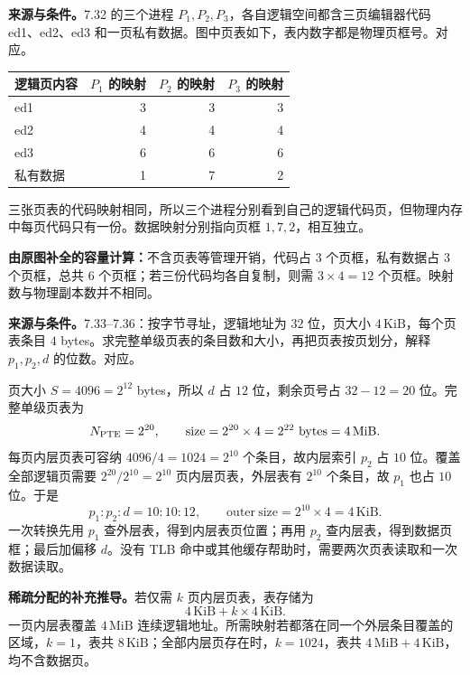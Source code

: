 \nopagebreak[4]
\textbf{来源与条件。}7.32 的三个进程 $P_1,P_2,P_3$，各自逻辑空间都含三页编辑器代码 ed1、ed2、ed3 和一页私有数据。图中页表如下，表内数字都是物理页框号。对应。
\begin{center}
\begin{tabular}{@{}lrrr@{}}
\toprule
逻辑页内容 & $P_1$ 的映射 & $P_2$ 的映射 & $P_3$ 的映射 \\
\midrule
ed1 & 3 & 3 & 3 \\
ed2 & 4 & 4 & 4 \\
ed3 & 6 & 6 & 6 \\
私有数据 & 1 & 7 & 2 \\
\bottomrule
\end{tabular}
\end{center}
\begin{checkedsolution}
三张页表的代码映射相同，所以三个进程分别看到自己的逻辑代码页，但物理内存中每页代码只有一份。数据映射分别指向页框 $1,7,2$，相互独立。

\textbf{由原图补全的容量计算：}不含页表等管理开销，代码占 $3$ 个页框，私有数据占 $3$ 个页框，总共 $6$ 个页框；若三份代码均各自复制，则需 $3\times4=12$ 个页框。映射数与物理副本数并不相同。
\end{checkedsolution}

\nopagebreak[4]
\textbf{来源与条件。}7.33--7.36：按字节寻址，逻辑地址为 $32$ 位，页大小 $4\,\mathrm{KiB}$，每个页表条目 $4$ bytes。求完整单级页表的条目数和大小，再把页表按页划分，解释 $p_1,p_2,d$ 的位数。对应。

\begin{checkedsolution}
页大小 $S=4096=2^{12}$ bytes，所以 $d$ 占 $12$ 位，剩余页号占 $32-12=20$ 位。完整单级页表为
\[
 N_{\rm PTE}=2^{20},\qquad
 \mathrm{size}=2^{20}\times4=2^{22}\ \mathrm{bytes}=4\,\mathrm{MiB}.
\]
每页内层页表可容纳 $4096/4=1024=2^{10}$ 个条目，故内层索引 $p_2$ 占 $10$ 位。覆盖全部逻辑页需要 $2^{20}/2^{10}=2^{10}$ 页内层页表，外层表有 $2^{10}$ 个条目，故 $p_1$ 也占 $10$ 位。于是
\[
  p_1:p_2:d=10:10:12,\qquad
  \mathrm{outer\ size}=2^{10}\times4=4\,\mathrm{KiB}.
\]
一次转换先用 $p_1$ 查外层表，得到内层表页位置；再用 $p_2$ 查内层表，得到数据页框；最后加偏移 $d$。没有 TLB 命中或其他缓存帮助时，需要两次页表读取和一次数据读取。

\textbf{稀疏分配的补充推导。}若仅需 $k$ 页内层页表，表存储为
\[
  4\,\mathrm{KiB}+k\times4\,\mathrm{KiB}.
\]
一页内层表覆盖 $4\,\mathrm{MiB}$ 连续逻辑地址。所需映射若都落在同一个外层条目覆盖的区域，$k=1$，表共 $8\,\mathrm{KiB}$；全部内层页存在时，$k=1024$，表共 $4\,\mathrm{MiB}+4\,\mathrm{KiB}$，均不含数据页。
\end{checkedsolution}

